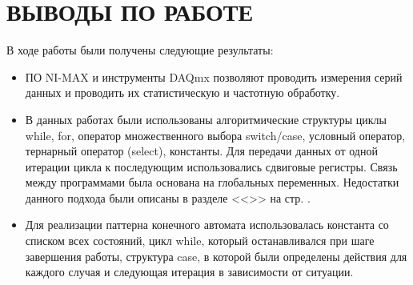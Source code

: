 \documentclass[a4paper,14pt]{article}
\begin{document}
\section{ВЫВОДЫ ПО РАБОТЕ}

В ходе работы были получены следующие результаты:

\begin{itemize} 
	\item ПО NI-MAX и инструменты DAQmx позволяют проводить измерения серий данных и проводить их статистическую и частотную обработку.
	\item В данных работах были использованы алгоритмические структуры циклы while, for, оператор множественного выбора switch/case, условный оператор, тернарный оператор (select), константы.
	Для передачи данных от одной итерации цикла к последующим использовались сдвиговые регистры.
	Связь между программами была основана на глобальных переменных. 
	Недостатки данного подхода были описаны в разделе <<>> на стр. \pageref{subs:proto}.
	\item Для реализации паттерна конечного автомата использовалась константа со списком всех состояний, цикл while, который останавливался при шаге завершения работы, структура case, в которой были определены действия для каждого случая и следующая итерация в зависимости от ситуации.
\end{itemize}
\end{document}
